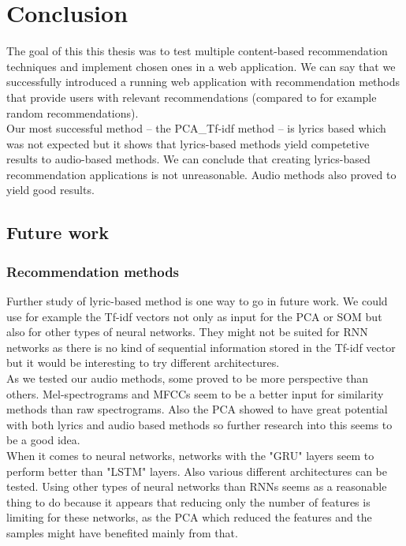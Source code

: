 \chapter*{Conclusion}
The goal of this this thesis was to test multiple content-based recommendation techniques and implement chosen ones in a web application. We can say that we successfully introduced a running web application with recommendation methods that provide users with relevant recommendations (compared to for example random recommendations). \\
Our most successful method -- the PCA\_Tf-idf method -- is lyrics based which was not expected but it shows that lyrics-based methods yield competetive results to audio-based methods. We can conclude that creating lyrics-based recommendation applications is not unreasonable. Audio methods also proved to yield good results. 

\section*{Future work}
\subsection*{Recommendation methods}
Further study of lyric-based method is one way to go in future work. We could use for example the Tf-idf vectors not only as input for the PCA or SOM but also for other types of neural networks. They might not be suited for RNN networks as there is no kind of sequential information stored in the Tf-idf vector but it would be interesting to try different architectures. \\
As we tested our audio methods, some proved to be more perspective than others. Mel-spectrograms and MFCCs seem to be a better input for similarity methods than raw spectrograms. Also the PCA showed to have great potential with both lyrics and audio based methods so further research into this seems to be a good idea. \\
When it comes to neural networks, networks with the "GRU" layers seem to perform better than "LSTM" layers. Also various different architectures can be tested. Using other types of neural networks than RNNs seems as a reasonable thing to do because it appears that reducing only the number of features is limiting for these networks, as the PCA which reduced the features and the samples might have benefited mainly from that. \\
